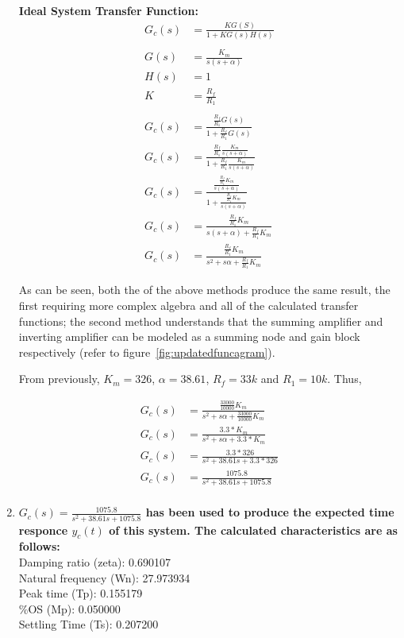 \documentclass[11pt,a4paper]{article}
\begin{document}
\begin{enumerate}
\pagebreak
    \textbf{Ideal System Transfer Function:}\\
    \begin{align*}
    G_c(s) &= \frac{K G(S)}{1 + K G(s) H(s)} \\\\
    G(s) &= \frac{K_m}{s(s+\alpha)} \\
    H(s) &= 1 \\
    K &= \frac{R_f}{R_1} \\\\
    G_c(s) &= \frac{\frac{R_f}{R_1} G(s)} {1 + \frac{R_f}{R_1} G(s)} \\
    G_c(s) &= \frac{\frac{R_f}{R_1} \frac{K_m}{s(s+\alpha)}} {1 + \frac{R_f}{R_1} \frac{K_m}{s(s+\alpha)}} \\
    G_c(s) &= \frac{\frac{\frac{R_f}{R_1}K_m}{s(s+\alpha)}} {1 + \frac{\frac{R_f}{R_1}K_m}{s(s+\alpha)}} \\
    G_c(s) &= \frac{\frac{R_f}{R_1}K_m} {s(s+\alpha) + \frac{R_f}{R_1}K_m} \\
    G_c(s) &= \frac{\frac{R_f}{R_1}K_m} {s^2 + s\alpha + \frac{R_f}{R_1}K_m}
	\end{align*}
    
    As can be seen, both the of the above methods produce the same result, the first requiring more complex algebra and all of the calculated transfer functions; the second method understands that the summing amplifier and inverting amplifier can be modeled as a summing node and gain block respectively (refer to figure~\ref{fig:updatedfuncagram}).
    
    From previously, $K_m = 326$, $\alpha = 38.61$, $R_f = 33k$ and $R_1 = 10k$.
    Thus,
    
    \begin{align*}
	G_c(s) &= \frac{\frac{33000}{10000}K_m} {s^2 + s\alpha + \frac{33000}{10000}K_m} \\
    G_c(s) &= \frac{3.3*K_m} {s^2 + s\alpha + 3.3*K_m} \\
    G_c(s) &= \frac{3.3*326} {s^2 + 38.61s + 3.3*326} \\
    G_c(s) &= \frac{1075.8} {s^2 + 38.61s + 1075.8} \\
	\end{align*}
    
    
    
    
    
    
    
    
    
    
	\item
	\textbf{$G_c(s) = \frac{1075.8} {s^2 + 38.61s + 1075.8}$ has been used to produce the expected time responce $y_c(t)$ of this system. The calculated characteristics are as follows:}\\
	Damping ratio (zeta): 0.690107\\
	Natural frequency (Wn): 27.973934\\
	Peak time (Tp): 0.155179\\
	\%OS (Mp): 0.050000\\
	Settling Time (Ts): 0.207200
    

\end{enumerate}
\end{document}
